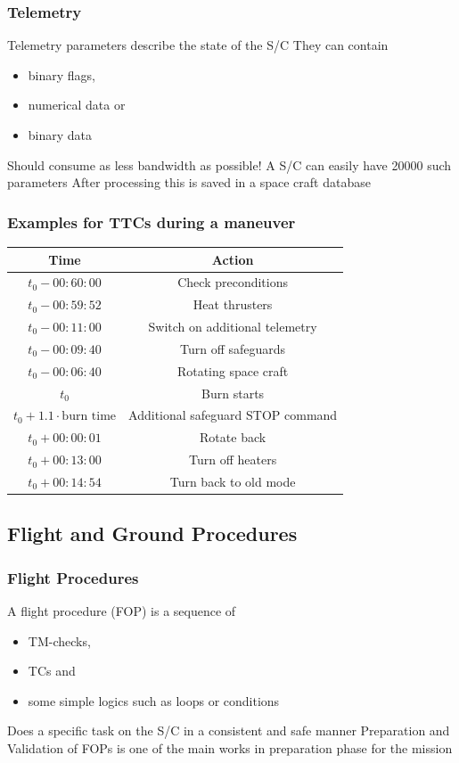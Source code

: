 \documentclass[12pt,utf8,notheorems,compress]{beamer}
\begin{document}
\begin{frame}
  \frametitle{Telemetry}
  \pause
  \vfill
  Telemetry parameters describe the state of the S/C \pause
  \vfill
  They can contain
  \begin{itemize}
  \item binary flags, \pause
  \item numerical data or \pause
  \item binary data \pause
  \end{itemize}
  \vfill
  Should consume as less bandwidth as possible! \pause
  \vfill
  A S/C can easily have 20000 such parameters \pause
  \vfill
  After processing this is saved in a space craft database
\end{frame}

\begin{frame}
  \frametitle{Examples for TTCs during a maneuver}
  \pause
  \centering
  \begin{tabular}{|c|c|}\hline
    Time & Action \\ \hline
    $t_0-00:60:00$ & Check preconditions \\
    $t_0-00:59:52$ & Heat thrusters \\
    $t_0-00:11:00$ & Switch on additional telemetry \\
    $t_0-00:09:40$ & Turn off safeguards \\
    $t_0-00:06:40$ & Rotating space craft \\
    $t_0$ & Burn starts \\
    $t_0+1.1\cdot \text{burn time}$ & Additional safeguard STOP command \\
    $t_0+00:00:01$ & Rotate back \\
    $t_0+00:13:00$ & Turn off heaters \\
    $t_0+00:14:54$ & Turn back to old mode \\ \hline
  \end{tabular}
\end{frame}

\subsection{Flight and Ground Procedures}

\begin{frame}
  \frametitle{Flight Procedures}
  \pause
  A flight procedure (FOP) is a sequence of \pause
  \begin{itemize}
  \item TM-checks, \pause
  \item TCs and \pause
  \item some simple logics such as loops or conditions
  \end{itemize}
  \vfill
  Does a specific task on the S/C in a consistent and safe manner
  \vfill
  Preparation and Validation of FOPs is one of the main works in preparation phase for the mission
\end{frame}
\end{document}
